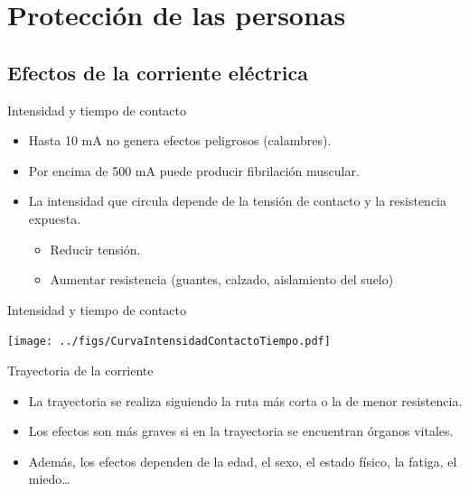 \documentclass[aspectratio=169, usenames,svgnames,dvipsnames]{beamer}
\begin{document}
\section{Protección de las personas}
\label{sec:org61a6ada}

\subsection{Efectos de la corriente eléctrica}
\label{sec:org0a3696c}

\begin{frame}[label={sec:org4f12f47}]{Intensidad y tiempo de contacto}
\begin{itemize}
\item Hasta 10 mA no genera efectos peligrosos (calambres).

\item Por encima de 500 mA puede producir fibrilación muscular.

\item La \alert{intensidad} que circula \alert{depende de la tensión de contacto y la
resistencia expuesta}.

\begin{itemize}
\item Reducir tensión.

\item Aumentar resistencia (guantes, calzado, aislamiento del suelo)
\end{itemize}
\end{itemize}
\end{frame}

\begin{frame}[label={sec:org28515a2}]{Intensidad y tiempo de contacto}
\begin{center}
\texttt{[image: ../figs/CurvaIntensidadContactoTiempo.pdf]}
\end{center}
\end{frame}

\begin{frame}[label={sec:org0f067b7}]{Trayectoria de la corriente}
\begin{itemize}
\item La trayectoria se realiza siguiendo la ruta más corta o la de menor
resistencia.

\item Los efectos son más graves si en la trayectoria se encuentran órganos
vitales.

\item Además, los efectos dependen de la edad, el sexo, el estado físico,
la fatiga, el miedo\ldots{}
\end{itemize}
\end{frame}
\end{document}
